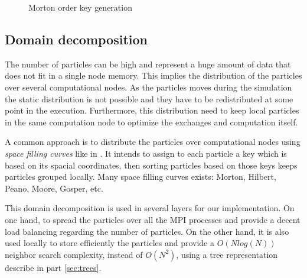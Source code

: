 \begin{figure}
\caption{Morton order key generation}
\end{figure}

\begin{figure}
\begin{tikzpicture}
\end{tikzpicture}
\end{figure}

\subsection{Domain decomposition}
\label{sec:domain_decomposition}
The number of particles can be high and represent a huge amount of data that does not fit in a single node memory. 
This implies the distribution of the particles over several computational nodes. 
As the particles moves during the simulation the static distribution is not possible and they have to be redistributed at some point in the execution. 
Furthermore, this distribution need to keep local particles in the same computation node to optimize the exchanges and computation itself.

A common approach is to distribute the particles over computational nodes using \textit{space filling curves} like in \cite{warren20132hot,springel2005cosmological,bedorf201424}. 
It intends to assign to each particle a key which is based on its spacial coordinates, then sorting particles based on those keys keeps particles grouped locally.
Many space filling curves exists: Morton, Hilbert, Peano, Moore, Gosper, etc.\

This domain decomposition is used in several layers for our implementation. 
On one hand, to spread the particles over all the MPI processes and provide a decent load balancing regarding the number of particles. 
On the other hand, it is also used locally to store efficiently the particles and provide a $O(N log(N))$ neighbor search complexity, instead of $O(N^2)$, using a tree representation describe in part \ref{sec:trees}. 

